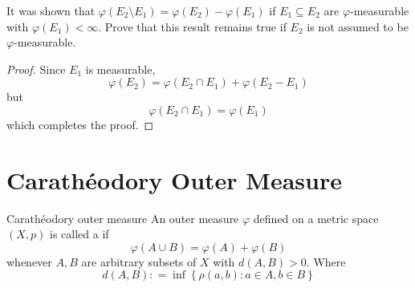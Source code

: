 \documentclass[../main.tex]{subfiles}
\begin{document}
\begin{exercise}{}{}
    It was shown that \(   \varphi \left( E_2\setminus E_1 \right)=  \varphi  \left( E_2 \right)- \varphi \left( E_1 \right)     \) if \(  E_1\subseteq E_2  \) are \(   \varphi   \)-measurable with \(   \varphi \left( E_1 \right)< \infty   \). Prove that this result remains true if \(  E_2  \) is not assumed to be \(   \varphi   \)-measurable.      
\end{exercise}
\begin{proof}
   Since \(  E_1  \) is measurable,    \[
      \varphi \left( E_2 \right)=  \varphi \left( E_2\cap E_1 \right)+  \varphi \left( E_2-E_1 \right)   
     \] but \[
      \varphi \left( E_2\cap E_1 \right)=  \varphi \left( E_1 \right)  
     \]which completes the proof. 
\end{proof}

\section{Carath\'eodory Outer Measure}

\begin{definition}{Carath\'eodory outer measure}{}
    An outer measure \(   \varphi  \) defined on a metric space \(  \left( X,p \right)   \) is called a  if \[
     \varphi \left( A\cup B \right)=  \varphi \left( A \right)+  \varphi \left( B \right)   
    \] whenever \(  A,B  \) are arbitrary subsets of \(  X  \) with \(  d\left( A,B \right)> 0   \). Where \[
    d\left( A,B \right): = \inf \left\{ \rho \left( a,b \right): a \in A, b\in B  \right\} 
    \]     
\end{definition}
\end{document}
